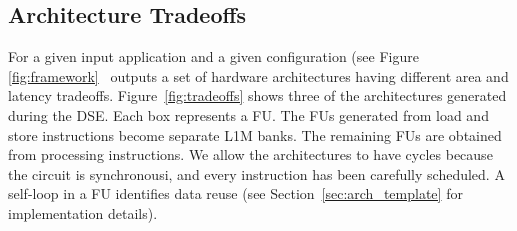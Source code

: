 \subsection{Architecture Tradeoffs}
For a given input application and a given configuration (see Figure \ref{fig:framework} \frameworkname~outputs a set of hardware architectures having different area and latency tradeoffs. Figure~\ref{fig:tradeoffs} shows three of the architectures generated during the DSE. Each box represents a FU. The FUs generated from load and store instructions become separate L1M banks. The remaining FUs are obtained from processing instructions. We allow the architectures to have cycles because the circuit is synchronousi, and every instruction has been carefully scheduled. A self-loop in a FU identifies data reuse (see Section~\ref{sec:arch_template} for implementation details).
